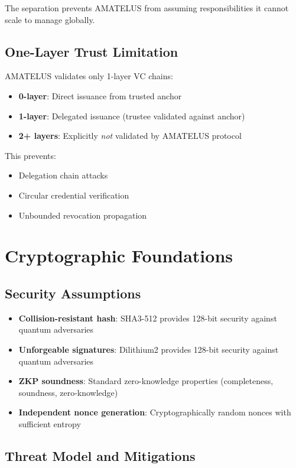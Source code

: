 The separation prevents AMATELUS from assuming responsibilities it cannot scale to manage globally.

\section{One-Layer Trust Limitation}

AMATELUS validates only 1-layer VC chains:

\begin{itemize}
  \item \textbf{0-layer}: Direct issuance from trusted anchor
  \item \textbf{1-layer}: Delegated issuance (trustee validated against anchor)
  \item \textbf{2+ layers}: Explicitly \emph{not} validated by AMATELUS protocol
\end{itemize}

This prevents:
\begin{itemize}
  \item Delegation chain attacks
  \item Circular credential verification
  \item Unbounded revocation propagation
\end{itemize}

\chapter{Cryptographic Foundations}

\section{Security Assumptions}

\begin{itemize}
  \item \textbf{Collision-resistant hash}: SHA3-512 provides 128-bit security against quantum adversaries
  \item \textbf{Unforgeable signatures}: Dilithium2 provides 128-bit security against quantum adversaries
  \item \textbf{ZKP soundness}: Standard zero-knowledge properties (completeness, soundness, zero-knowledge)
  \item \textbf{Independent nonce generation}: Cryptographically random nonces with sufficient entropy
\end{itemize}

\section{Threat Model and Mitigations}

